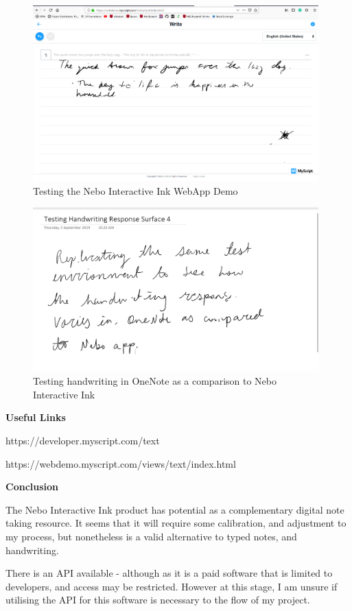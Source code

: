 \documentclass{article}
\begin{document}
\begin{figure}
    \centering
    \includegraphics[width=11cm]{Images/NeboTest001.PNG}
    \caption{Testing the Nebo Interactive Ink WebApp Demo}
    \label{fig:Nebo Interactive Ink WebApp}
\end{figure}

\begin{figure}
    \centering
    \includegraphics[width=11cm]{Images/OneNoteTest001.PNG}
    \caption{Testing handwriting in OneNote as a comparison to Nebo Interactive Ink}
    \label{fig:OneNote Handwriting}
\end{figure}
\textbf{Useful Links}

https://developer.myscript.com/text

https://webdemo.myscript.com/views/text/index.html

\textbf{Conclusion}

The Nebo Interactive Ink product has potential as a complementary digital note taking resource. It seems that it will require some calibration, and adjustment to my process, but nonetheless is a valid alternative to typed notes, and handwriting.

There is an API available - although as it is a paid software that is limited to developers, and access may be restricted. However at this stage, I am unsure if utilising the API for this software is necessary to the flow of my project. 
\end{document}
